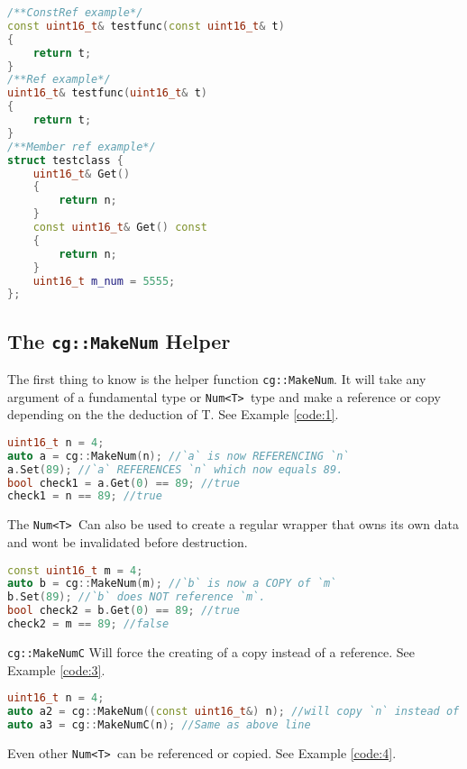 \documentclass{article}
\newcommand{\theobj}{\protect\Verb+Num<T> +}
\begin{document}
\begin{lstlisting}[language=C++, label=code:test, caption=Test Functions and Classes]
/**ConstRef example*/
const uint16_t& testfunc(const uint16_t& t)
{
	return t;
}
/**Ref example*/
uint16_t& testfunc(uint16_t& t)
{
	return t;
}
/**Member ref example*/
struct testclass {
	uint16_t& Get()
	{
		return n;
	}
	const uint16_t& Get() const
	{
		return n;
	}
	uint16_t m_num = 5555;
};
\end{lstlisting}
\pagebreak
\subsection{The \protect\Verb+cg::MakeNum+ Helper}
\label{s:helper}

The first thing to know is the helper function \protect\Verb+cg::MakeNum+.  It will take any argument of a fundamental type or \theobj type and make a reference or copy depending on the the deduction of T. See Example \vref{code:1}. 

\begin{lstlisting}[language=C++, label=code:1, caption=Reference with cg::MakeNum]
uint16_t n = 4;
auto a = cg::MakeNum(n); //`a` is now REFERENCING `n`
a.Set(89); //`a` REFERENCES `n` which now equals 89.
bool check1 = a.Get(0) == 89; //true
check1 = n == 89; //true
\end{lstlisting}

The \theobj Can also be used to create a regular wrapper that owns its own data and wont be invalidated before destruction.  

\begin{lstlisting}[language=C++, label=code:2, caption=Copy with cg::MakeNum]
const uint16_t m = 4;
auto b = cg::MakeNum(m); //`b` is now a COPY of `m`
b.Set(89); //`b` does NOT reference `m`.
bool check2 = b.Get(0) == 89; //true
check2 = m == 89; //false
\end{lstlisting}

\protect\Verb+cg::MakeNumC+ Will force the creating of a copy instead of a reference. See Example \vref{code:3}.

\begin{lstlisting}[language=C++, label=code:3, caption=cg::Forcing Copies]
uint16_t n = 4;
auto a2 = cg::MakeNum((const uint16_t&) n); //will copy `n` instead of reference.
auto a3 = cg::MakeNumC(n); //Same as above line
\end{lstlisting}

Even other \theobj can be referenced or copied. See Example \vref{code:4}.
\end{document}
